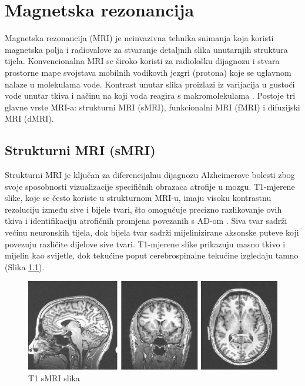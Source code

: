 \documentclass[zavrsnirad]{fer}
\begin{document}
\label{pog:glavni_dio}

\chapter{Magnetska rezonancija}

Magnetska rezonancija (MRI) je neinvazivna tehnika snimanja koja koristi magnetska polja i radiovalove za stvaranje detaljnih slika unutarnjih struktura tijela. Konvencionalna MRI se široko koristi za radiološku dijagnozu i stvara prostorne mape svojstava mobilnih vodikovih jezgri (protona) koje se uglavnom nalaze u molekulama vode. Kontrast unutar slika proizlazi iz varijacija u gustoći vode unutar tkiva i načinu na koji voda reagira s makromolekulama \cite{Gore2003}. Postoje tri glavne vrste MRI-a: strukturni MRI (sMRI), funkcionalni MRI (fMRI) i difuzijski MRI (dMRI).


\section{Strukturni MRI (sMRI)}
Strukturni MRI je ključan za diferencijalnu dijagnozu Alzheimerove bolesti zbog svoje sposobnosti vizualizacije specifičnih obrazaca atrofije u mozgu. T1-mjerene slike, koje se često koriste u strukturnom MRI-u, imaju visoku kontrastnu rezoluciju između sive i bijele tvari, što omogućuje precizno razlikovanje ovih tkiva i identifikaciju atrofičnih promjena povezanih s AD-om \cite{Gonuguntla2022}. Siva tvar sadrži većinu neuronskih tijela, dok bijela tvar sadrži mijelinizirane aksonske puteve koji povezuju različite dijelove sive tvari. T1-mjerene slike prikazuju masno tkivo i mijelin kao svijetle, dok tekućine poput cerebrospinalne tekućine izgledaju tamno (Slika \ref{fig:sMRI_T1}).

\begin{figure}[h]
	\centering
	\includegraphics[width=1\textwidth]{Figures/T1_sMRI.png}
	\caption{T1 sMRI slika \cite{ucsd2021}}
	\label{fig:sMRI_T1}
\end{figure}
\end{document}
